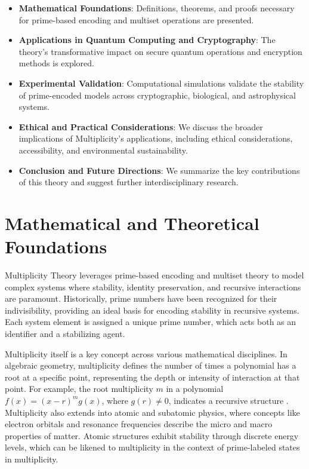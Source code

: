 \documentclass{article}
\theoremstyle{plain}
\begin{document}
\begin{itemize}

\item \textbf{Mathematical Foundations}: Definitions, theorems, and proofs necessary for prime-based encoding and multiset operations are presented. \item \textbf{Applications in Quantum Computing and Cryptography}: The theory’s transformative impact on secure quantum operations and encryption methods is explored. \item \textbf{Experimental Validation}: Computational simulations validate the stability of prime-encoded models across cryptographic, biological, and astrophysical systems. \item \textbf{Ethical and Practical Considerations}: We discuss the broader implications of Multiplicity’s applications, including ethical considerations, accessibility, and environmental sustainability. \item \textbf{Conclusion and Future Directions}: We summarize the key contributions of this theory and suggest further interdisciplinary research.
\end{itemize}

\section{Mathematical and Theoretical Foundations}
Multiplicity Theory leverages prime-based encoding and multiset theory to model complex systems where stability, identity preservation, and recursive interactions are paramount. Historically, prime numbers have been recognized for their indivisibility, providing an ideal basis for encoding stability in recursive systems. Each system element is assigned a unique prime number, which acts both as an identifier and a stabilizing agent.

Multiplicity itself is a key concept across various mathematical disciplines. In algebraic geometry, multiplicity defines the number of times a polynomial has a root at a specific point, representing the depth or intensity of interaction at that point. For example, the root multiplicity \( m \) in a polynomial \( f(x) = (x - r)^m g(x) \), where \( g(r) \neq 0 \), indicates a recursive structure \citep{birkhoff1967}. Multiplicity also extends into atomic and subatomic physics, where concepts like electron orbitals and resonance frequencies describe the micro and macro properties of matter. Atomic structures exhibit stability through discrete energy levels, which can be likened to multiplicity in the context of prime-labeled states in multiplicity.
\end{document}
